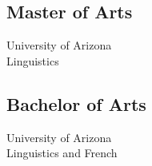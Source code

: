 \documentclass{resume}
\begin{document}
\begin{minipage}[t]{.3\textwidth}
        \subsection{Master of Arts}
            University of Arizona\\
            Linguistics\\

        \subsection{Bachelor of Arts}
            University of Arizona\\
            Linguistics and French\\

        
\end{minipage}
\hfill
\begin{minipage}[t]{.6\textwidth}
    
\end{minipage}
    \hfill
\end{document}

